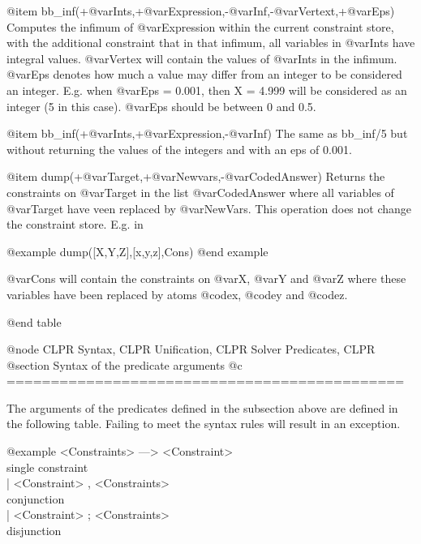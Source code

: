 	@item bb_inf(+@var{Ints},+@var{Expression},-@var{Inf},-@var{Vertext},+@var{Eps})
Computes the infimum of @var{Expression} within the current constraint
store, with the additional constraint that in that infimum, all
variables in @var{Ints} have integral values. @var{Vertex} will contain
the values of @var{Ints} in the infimum. @var{Eps} denotes how much a
value may differ from an integer to be considered an integer. E.g. when
@var{Eps} = 0.001, then X = 4.999 will be considered as an integer (5 in
this case). @var{Eps} should be between 0 and 0.5.

	@item bb_inf(+@var{Ints},+@var{Expression},-@var{Inf})
The same as bb_inf/5 but without returning the values of the integers
and with an eps of 0.001.

	@item dump(+@var{Target},+@var{Newvars},-@var{CodedAnswer})
Returns the constraints on @var{Target} in the list @var{CodedAnswer}
where all variables of @var{Target} have veen replaced by @var{NewVars}.
This operation does not change the constraint store. E.g. in

@example
dump([X,Y,Z],[x,y,z],Cons)
@end example

@var{Cons} will contain the constraints on @var{X}, @var{Y} and
@var{Z} where these variables have been replaced by atoms @code{x}, @code{y} and @code{z}.
 
@end table

@node CLPR Syntax, CLPR Unification, CLPR Solver Predicates, CLPR
@section Syntax of the predicate arguments
@c =============================================

The arguments of the predicates defined in the subsection above are
defined in the following table. Failing to meet the syntax rules will
result in an exception.

@example
<Constraints> ---> <Constraint>				\\ single constraint \\
	      | <Constraint> , <Constraints>		\\ conjunction \\
	      | <Constraint> ; <Constraints>		\\ disjunction \\

